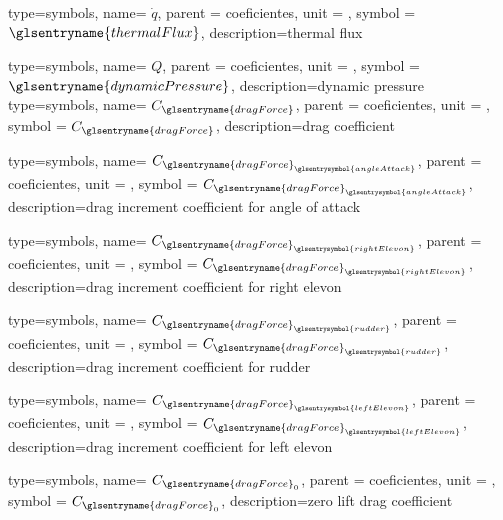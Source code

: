 {type=symbols,
    name= \ensuremath{\dot{q}},
    parent = {coeficientes},
    unit = \unexpanded{\si{\watt\per\square\meter}},
    symbol = \ensuremath{\glsentryname{thermalFlux}},
    description={thermal flux}
}


{type=symbols,
    name= \ensuremath{Q},
    parent = {coeficientes},
    unit = \unexpanded{\si{\newton\per\cubic\meter}},
    symbol = \ensuremath{\glsentryname{dynamicPressure}},
    description={dynamic pressure}
}
{type=symbols,
    name= \ensuremath{C_{\glsentryname{dragForce}}},
    parent = {coeficientes},
    unit = \unexpanded{},
    symbol = \ensuremath{C_{\glsentryname{dragForce}}},
    description={drag coefficient}
}

{type=symbols,
    name= \ensuremath{C_{{\glsentryname{dragForce}}_{\glsentrysymbol{angleAttack}}}},
    parent = {coeficientes},
    unit = \unexpanded{},
    symbol = \ensuremath{C_{{\glsentryname{dragForce}}_{\glsentrysymbol{angleAttack}}}},
    description={drag increment coefficient for angle of attack}
}


{type=symbols,
    name= \ensuremath{C_{{\glsentryname{dragForce}}_{\glsentrysymbol{rightElevon}}}},
    parent = {coeficientes},
    unit = \unexpanded{},
    symbol = \ensuremath{C_{{\glsentryname{dragForce}}_{\glsentrysymbol{rightElevon}}}},
    description={drag increment coefficient for right elevon}
}


{type=symbols,
    name= \ensuremath{C_{{\glsentryname{dragForce}}_{\glsentrysymbol{rudder}}}},
    parent = {coeficientes},
    unit = \unexpanded{},
    symbol = \ensuremath{C_{{\glsentryname{dragForce}}_{\glsentrysymbol{rudder}}}},
    description={drag increment coefficient for rudder}
}


{type=symbols,
    name= \ensuremath{C_{{\glsentryname{dragForce}}_{\glsentrysymbol{leftElevon}}}},
    parent = {coeficientes},
    unit = \unexpanded{},
    symbol = \ensuremath{C_{{\glsentryname{dragForce}}_{\glsentrysymbol{leftElevon}}}},
    description={drag increment coefficient for left elevon}
}







{type=symbols,
    name= \ensuremath{C_{{\glsentryname{dragForce}}_{0}}},
    parent = {coeficientes},
    unit = \unexpanded{},
    symbol = \ensuremath{C_{{\glsentryname{dragForce}}_{0}}},
    description={zero lift drag coefficient}
}

